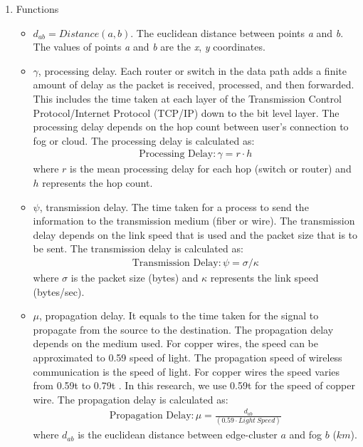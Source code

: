 \documentclass[10pt,journal,compsoc]{IEEEtran}
\begin{document}
\begin{enumerate}
\item Functions
\begin{itemize}
\item $d_{ab} = Distance (\textit{a}, \textit{b})$. The euclidean distance between points \textit{a} and \textit{b}. The values of points \textit{a} and \textit{b} are the \textit{x}, \textit{y} coordinates.
\item $\gamma$, processing delay. Each router or switch in the data path adds a finite amount of delay as the packet is received, processed, and then forwarded. This includes the time taken at each layer of the Transmission Control Protocol/Internet Protocol (TCP/IP) down to the bit level layer. The processing delay depends on the hop count between user's connection to fog or cloud. The processing delay is calculated as: 
\begin{align}
\text{Processing Delay} : \gamma = r \cdot h %
\end{align}
where $r$ is the mean processing delay for each hop (switch or router) and $h$ represents the hop count.
\item $\psi$, transmission delay. The time taken for a process to send the information to the transmission medium (fiber or wire). The transmission delay depends on the link speed that is used and the packet size that is to be sent. The transmission delay is calculated as: 
\begin{align}
\text{Transmission Delay} : \psi =\sigma / \kappa
\end{align}
where $\sigma$ is the packet size (bytes) and $\kappa$ represents the link speed (bytes/sec).
\item  $\mu$, propagation delay. It equals to the time taken for the signal to propagate from the source to the destination. The propagation delay depends on the medium used. For copper wires, the speed can be approximated to 0.59 speed of light. The propagation speed of wireless communication is the speed of light. For copper wires the speed varies from 0.59t to 0.79t \cite{cvijetic2013advanced}. In this research, we use 0.59t for the speed of copper wire. The propagation delay is calculated as:  
\begin{align}
\text{Propagation Delay} : \mu = \frac{d_{ab}}{(0.59 \cdot Light\ Speed)}
\end{align}
where $d_{ab}$ is the euclidean distance between edge-cluster $a$ and fog $b$ ($km$). 


\end{itemize}
\end{enumerate}
\end{document}
